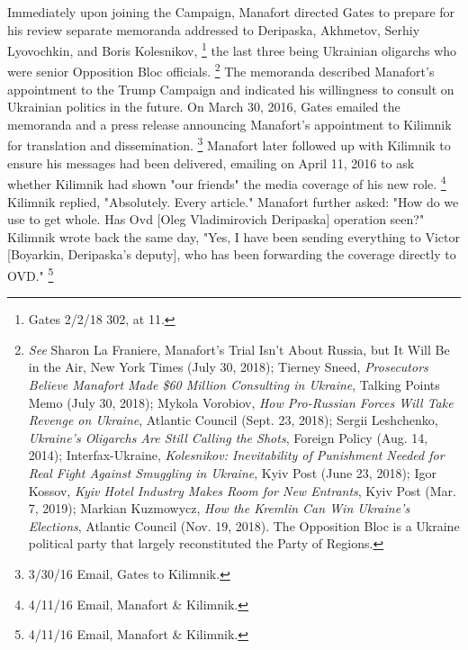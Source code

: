 Immediately upon joining the Campaign, Manafort directed Gates to prepare for his review separate memoranda addressed to Deripaska, Akhmetov, Serhiy Lyovochkin, and Boris Kolesnikov,%
\footnote{Gates 2/2/18 302, at 11.}
the last three being Ukrainian oligarchs who were senior Opposition Bloc officials.%
\footnote{\textit{See} Sharon La Franiere, Manafort’s Trial Isn’t About Russia, but It Will Be in the Air, New York Times (July 30, 2018);
Tierney Sneed, \textit{Prosecutors Believe Manafort Made \$60 Million Consulting in Ukraine}, Talking Points Memo (July 30, 2018);
Mykola Vorobiov, \textit{How Pro-Russian Forces Will Take Revenge on Ukraine}, Atlantic Council (Sept. 23, 2018);
Sergii Leshchenko, \textit{Ukraine’s Oligarchs Are Still Calling the Shots}, Foreign Policy (Aug. 14, 2014);
Interfax-Ukraine, \textit{Kolesnikov: Inevitability of Punishment Needed for Real Fight Against Smuggling in Ukraine}, Kyiv Post (June 23, 2018);
Igor Kossov, \textit{Kyiv Hotel Industry Makes Room for New Entrants}, Kyiv Post (Mar. 7, 2019);
Markian Kuzmowycz, \textit{How the Kremlin Can Win Ukraine’s Elections}, Atlantic Council (Nov. 19, 2018).
The Opposition Bloc is a Ukraine political party that largely reconstituted the Party of Regions.
}
The memoranda described Manafort's appointment to the Trump Campaign and indicated his willingness to consult on Ukrainian politics in the future.
On March 30, 2016, Gates emailed the memoranda and a press release announcing Manafort's appointment to Kilimnik for translation and dissemination.%
\footnote{3/30/16 Email, Gates to Kilimnik.}
Manafort later followed up with Kilimnik to ensure his messages had been delivered, emailing on April 11, 2016 to ask whether Kilimnik had shown "our friends" the media coverage of his new role.%
\footnote{4/11/16 Email, Manafort \& Kilimnik.}
Kilimnik replied, "Absolutely.
Every article."
Manafort further asked: "How do we use to get whole.
Has Ovd [Oleg Vladimirovich Deripaska] operation seen?"
Kilimnik wrote back the same day, "Yes, I have been sending everything to Victor [Boyarkin, Deripaska's deputy], who has been forwarding the coverage directly to OVD."%
\footnote{4/11/16 Email, Manafort \& Kilimnik.}


